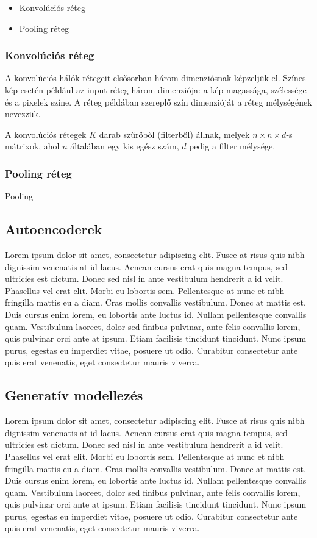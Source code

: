 \documentclass[12pt]{article}
\begin{document}
\begin{itemize}
  \item Konvolúciós réteg
  \item Pooling réteg
\end{itemize}

\subsubsection{Konvolúciós réteg}

A konvolúciós hálók rétegeit elsősorban három dimenziósnak képzeljük el. Színes kép esetén például az input réteg három dimenziója: a kép magassága, szélessége és a pixelek színe. A réteg példában szereplő szín dimenzióját a réteg mélységének nevezzük.

A konvolúciós rétegek $K$ darab szűrőből (filterből) állnak, melyek $n\times n \times d$-s mátrixok, ahol $n$ általában egy kis egész szám, $d$ pedig a filter mélysége.


\subsubsection{Pooling réteg}

Pooling

\subsection{Autoencoderek}

Lorem ipsum dolor sit amet, consectetur adipiscing elit. Fusce at risus quis nibh dignissim venenatis at id lacus. Aenean cursus erat quis magna tempus, sed ultricies est dictum. Donec sed nisl in ante vestibulum hendrerit a id velit. Phasellus vel erat elit. Morbi eu lobortis sem. Pellentesque at nunc et nibh fringilla mattis eu a diam. Cras mollis convallis vestibulum. Donec at mattis est. Duis cursus enim lorem, eu lobortis ante luctus id. Nullam pellentesque convallis quam. Vestibulum laoreet, dolor sed finibus pulvinar, ante felis convallis lorem, quis pulvinar orci ante at ipsum. Etiam facilisis tincidunt tincidunt. Nunc ipsum purus, egestas eu imperdiet vitae, posuere ut odio. Curabitur consectetur ante quis erat venenatis, eget consectetur mauris viverra.

\subsection{Generatív modellezés}

Lorem ipsum dolor sit amet, consectetur adipiscing elit. Fusce at risus quis nibh dignissim venenatis at id lacus. Aenean cursus erat quis magna tempus, sed ultricies est dictum. Donec sed nisl in ante vestibulum hendrerit a id velit. Phasellus vel erat elit. Morbi eu lobortis sem. Pellentesque at nunc et nibh fringilla mattis eu a diam. Cras mollis convallis vestibulum. Donec at mattis est. Duis cursus enim lorem, eu lobortis ante luctus id. Nullam pellentesque convallis quam. Vestibulum laoreet, dolor sed finibus pulvinar, ante felis convallis lorem, quis pulvinar orci ante at ipsum. Etiam facilisis tincidunt tincidunt. Nunc ipsum purus, egestas eu imperdiet vitae, posuere ut odio. Curabitur consectetur ante quis erat venenatis, eget consectetur mauris viverra.
\end{document}
